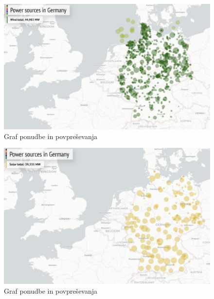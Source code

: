 \documentclass[12pt,a4paper]{amsart}
\theoremstyle{definition} %
\theoremstyle{plain} %
\begin{document}
{\begin{figure}[h]
    \centering
    \includegraphics[scale=0.25]{wind_2016.png}
    \caption{Graf ponudbe in povpreševanja}
    \label{fig:veter}
\end{figure}

\begin{figure}[h]
    \centering
    \includegraphics[scale=0.25]{solar_2016.png}
    \caption{Graf ponudbe in povpreševanja}
    \label{fig:sonce}
\end{figure}










}
\end{document}

